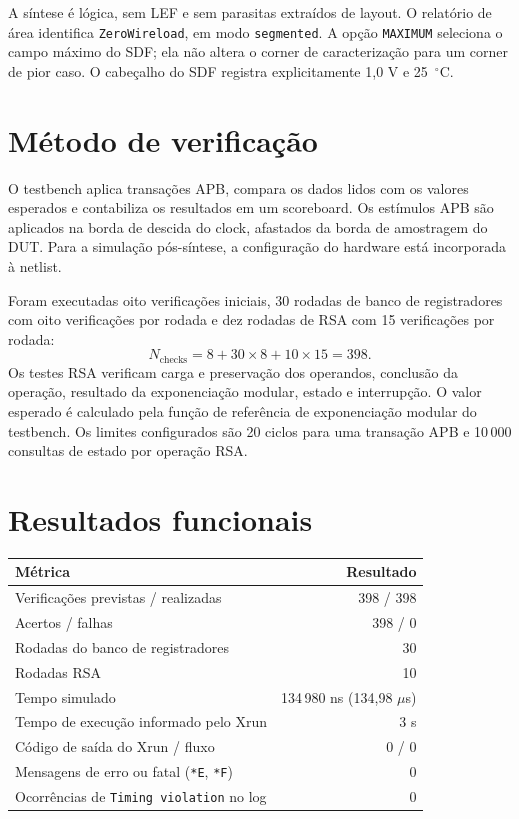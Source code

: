 \documentclass[11pt,a4paper]{article}
\begin{document}
A síntese é lógica, sem LEF e sem parasitas extraídos de layout. O relatório
de área identifica \texttt{ZeroWireload}, em modo \texttt{segmented}.
A opção \texttt{MAXIMUM} seleciona o campo máximo do SDF; ela não altera
o corner de caracterização para um corner de pior caso. O cabeçalho do
SDF registra explicitamente 1,0 V e 25~$^{\circ}$C.

\section{Método de verificação}

O testbench  aplica transações APB,
compara os dados lidos com os valores esperados e contabiliza os resultados
em um scoreboard. Os estímulos APB são aplicados na borda de descida do
clock, afastados da borda de amostragem do DUT. Para a simulação pós-síntese,
a configuração do hardware está incorporada à netlist.

Foram executadas oito verificações iniciais, 30 rodadas de banco de
registradores com oito verificações por rodada e dez rodadas de RSA com
15 verificações por rodada:
\[
N_{\mathrm{checks}} = 8 + 30\times8 + 10\times15 = 398.
\]
Os testes RSA verificam carga e preservação dos operandos, conclusão da
operação, resultado da exponenciação modular, estado e interrupção.
O valor esperado é calculado pela função de referência de exponenciação
modular do testbench. Os limites configurados são 20 ciclos para uma
transação APB e 10\,000 consultas de estado por operação RSA.

\section{Resultados funcionais}

\begin{center}
\begin{tabular}{@{}lr@{}}
\toprule
Métrica & Resultado \\
\midrule
Verificações previstas / realizadas & 398 / 398 \\
Acertos / falhas & 398 / 0 \\
Rodadas do banco de registradores & 30 \\
Rodadas RSA & 10 \\
Tempo simulado & 134\,980 ns (134,98 $\mu$s) \\
Tempo de execução informado pelo Xrun & 3 s \\
Código de saída do Xrun / fluxo & 0 / 0 \\
Mensagens de erro ou fatal (\texttt{*E}, \texttt{*F}) & 0 \\
Ocorrências de \texttt{Timing violation} no log & 0 \\
\bottomrule
\end{tabular}
\end{center}
\end{document}
